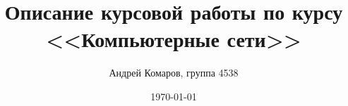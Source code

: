 \documentclass[a4paper,12pt]{article}
\begin{document}
\title{Описание курсовой работы по курсу <<Компьютерные сети>>}
\author{Андрей Комаров, группа 4538}
\date{\today}
\maketitle


\end{document}
